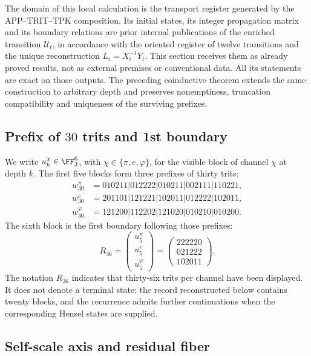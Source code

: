 The domain of this local calculation is the transport register generated by the
APP--TRIT--TPK composition. Its initial states, its integer propagation
matrix and its boundary relations are prior internal publications of
the enriched transition \(\mathcal U_t\), in accordance with the oriented register of
twelve transitions and the unique reconstruction
\(L_i=X_i^{-1}Y_i\). This section receives them as already proved results,
not as external premises or conventional data. All its statements
are exact on those outputs. The preceding coinductive theorem extends the
same construction to arbitrary depth and preserves nonemptiness,
truncation compatibility and uniqueness of the surviving prefixes.

\subsection{Prefix of \(30\) trits and 1st boundary}

We write \(u_k^\chi\in\FF_3^6\), with
\(\chi\in\{\pi,e,\varphi\}\), for the visible block of channel \(\chi\) at
depth \(k\). The first five blocks form three prefixes of thirty
trits:
\begin{align*}
w_{30}^{\pi}&=010211|012222|010211|002111|110221,\\
w_{30}^{e}&=201101|121221|102011|012222|102011,\\
w_{30}^{\varphi}&=121200|112202|121020|010210|010200.
\end{align*}
The sixth block is the first boundary following those prefixes:
\[
R_{36}=
\begin{pmatrix}
u_5^\pi\\ u_5^e\\ u_5^\varphi
\end{pmatrix}
=
\begin{pmatrix}
222220\\021222\\102011
\end{pmatrix}.
\]
The notation \(R_{36}\) indicates that thirty-six trits per
channel have been displayed. It does not denote a terminal state: the record reconstructed below
contains twenty blocks, and the recurrence admits further continuations
when the corresponding Hensel states are supplied.

\subsection{Self-scale axis and residual fiber}

